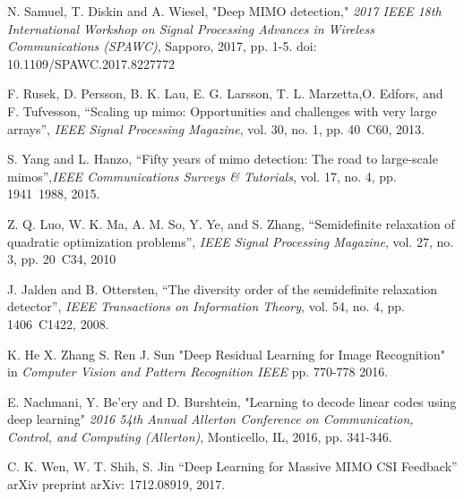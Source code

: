 \documentclass[conference]{IEEEtran}
\begin{document}
\begin{thebibliography}{99}
N. Samuel, T. Diskin and A. Wiesel, "Deep MIMO detection," \emph{2017 IEEE 18th International Workshop on Signal Processing Advances in Wireless Communications (SPAWC)}, Sapporo, 2017, pp. 1-5. doi: 10.1109/SPAWC.2017.8227772

F. Rusek, D. Persson, B. K. Lau, E. G. Larsson, T. L. Marzetta,O. Edfors, and F. Tufvesson, “Scaling up mimo: Opportunities and challenges with very large arrays”, \emph{IEEE Signal Processing Magazine}, vol. 30, no. 1, pp. 40~C60, 2013.

S. Yang and L. Hanzo, “Fifty years of mimo detection: The road to large-scale mimos”,\emph{IEEE Communications Surveys \& Tutorials}, vol. 17, no. 4, pp. 1941~1988, 2015.

Z. Q. Luo, W. K. Ma, A. M. So, Y. Ye, and S. Zhang, “Semidefinite relaxation of quadratic optimization problems”, \emph{IEEE Signal Processing Magazine}, vol. 27, no. 3, pp. 20~C34, 2010

J. Jalden and B. Ottersten, “The diversity order of the semidefinite relaxation detector”, \emph{IEEE Transactions on Information Theory}, vol. 54, no. 4, pp. 1406~C1422, 2008.

K. He X. Zhang S. Ren J. Sun "Deep Residual Learning for Image Recognition" in \emph{Computer Vision and Pattern Recognition IEEE} pp. 770-778 2016.

E. Nachmani, Y. Be'ery and D. Burshtein, "Learning to decode linear codes using deep learning" \emph{2016 54th Annual Allerton Conference on Communication, Control, and Computing (Allerton)}, Monticello, IL, 2016, pp. 341-346.

C. K. Wen, W. T. Shih, S. Jin “Deep Learning for Massive MIMO CSI Feedback” arXiv preprint arXiv: 1712.08919, 2017.

\end{thebibliography}
\end{document}
